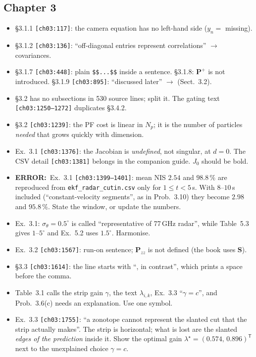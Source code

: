 \documentclass[10pt,a4paper]{article}
\newcommand{\src}[1]{{\footnotesize\texttt{[#1]}}}
\newcommand{\err}{\textbf{ERROR:}~}
\begin{document}
\subsection*{Chapter 3}
\begin{itemize}
\item \S3.1.1 \src{ch03:117}: the camera equation has no left-hand side ($y_n=$ missing).
\item \S3.1.2 \src{ch03:136}: ``off-diagonal entries represent correlations'' $\to$ covariances.
\item \S3.1.7 \src{ch03:448}: plain \verb|$$...$$| inside a sentence. \S3.1.8: $\mathbf{P}^{+}$ is not introduced. \S3.1.9 \src{ch03:895}: ``discussed later'' $\to$ (Sect.~3.2).
\item \S3.2 has no subsections in 530 source lines; split it. The gating text \src{ch03:1250--1272} duplicates \S3.4.2.
\item \S3.2 \src{ch03:1239}: the PF cost is linear in $N_p$; it is the number of particles \emph{needed} that grows quickly with dimension.
\item Ex.~3.1 \src{ch03:1376}: the Jacobian is \emph{undefined}, not singular, at $d=0$. The CSV detail \src{ch03:1381} belongs in the companion guide. $J_0$ should be bold.
\item \err Ex.~3.1 \src{ch03:1399--1401}: mean NIS $2.54$ and $98.8\,\%$ are reproduced from \texttt{ekf\_radar\_cutin.csv} only for $1\le t<5$\,s. With $8$--$10$\,s included (``constant-velocity segments'', as in Prob.~3.10) they become $2.98$ and $95.8\,\%$. State the window, or update the numbers.
\item Ex.~3.1: $\sigma_\theta=0.5^\circ$ is called ``representative of 77\,GHz radar'', while Table~5.3 gives $1$--$5^\circ$ and Ex.~5.2 uses $1.5^\circ$. Harmonise.
\item Ex.~3.2 \src{ch03:1567}: run-on sentence; $\mathbf{P}_{zz}$ is not defined (the book uses $\mathbf{S}$).
\item \S3.3 \src{ch03:1614}: the line starts with ``, in contrast'', which prints a space before the comma.
\item Table~3.1 calls the strip gain $\gamma$, the text $\lambda_{i,k}$, Ex.~3.3 ``$\gamma=c$'', and Prob.~3.6(c) needs an explanation. Use one symbol.
\item Ex.~3.3 \src{ch03:1755}: ``a zonotope cannot represent the slanted cut that the strip actually makes''. The strip is horizontal; what is lost are the slanted \emph{edges of the prediction} inside it. Show the optimal gain $\lambda^\star=(0.574,\,0.896)^{\mathsf T}$ next to the unexplained choice $\gamma=c$.

\end{itemize}
\end{document}
